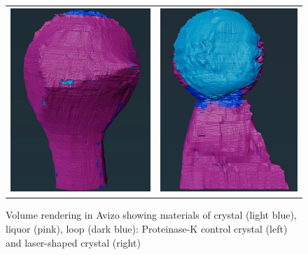 \begin{figure}
    \begin{tabular}{cc}
	\includegraphics[height=7cm]{images/avizo_flats/prot_con.png} & \includegraphics[height=7cm]{images/avizo_flats/prot_ls.jpg}
    \end{tabular}
    \caption{Volume rendering in Avizo showing materials of crystal (light blue), liquor (pink), loop (dark blue): Proteinase-K control crystal (left) and laser-shaped crystal (right)}
    \label{avizo_proteinasek}
\end{figure}


\onecolumn


\newpage
